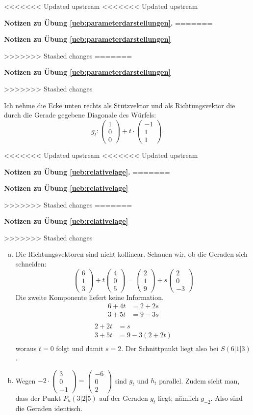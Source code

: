 \documentclass[%
11pt,%
twoside,%
titlepage,%
<<<<<<< Updated upstream
<<<<<<< Updated upstream
german,%
=======
swissgerman,%
>>>>>>> Stashed changes
=======
swissgerman,%
>>>>>>> Stashed changes
headsepline%
]{scrartcl}
\newcommand{\faReturnGray}{\textcolor{gray}{\faMailReply}} %
\newcommand{\faReturnGray}{\textcolor{gray}{\faMailReply}} %
\theoremstyle{definition}
\theoremstyle{plain}
\newcommand{\concatueb}[1]{ueb:#1}%
\newcommand{\concatlsg}[1]{lsg:#1}%
\newenvironment{lsg}[1]{%
<<<<<<< Updated upstream
<<<<<<< Updated upstream
    \par\noindent\textbf{Notizen zu Übung \ref{\concatueb{#1}}.}%
    \label{\concatlsg{#1}}
=======
    \par\noindent\textbf{Notizen zu Übung \ref{\concatueb{#1}}}\label{\concatlsg{#1}}
    \hfill\hyperref[\concatueb{#1}]{\faReturnGray}\par %
>>>>>>> Stashed changes
=======
    \par\noindent\textbf{Notizen zu Übung \ref{\concatueb{#1}}}\label{\concatlsg{#1}}
    \hfill\hyperref[\concatueb{#1}]{\faReturnGray}\par %
>>>>>>> Stashed changes
}{%
    \par%
}
\begin{document}
\begin{lsg}{parameterdarstellungen}
Ich nehme die Ecke unten rechts als Stützvektor und als Richtungsvektor die durch die Gerade gegebene Diagonale des Würfels:
$$g_t:\begin{pmatrix}
    1\\0\\0
\end{pmatrix}+t\cdot\begin{pmatrix}
    -1\\1\\1
\end{pmatrix}.$$
\end{lsg}
\begin{lsg}{relativelage}
\begin{enumerate}[a)]
    \item Die Richtungsvektoren sind nicht kollinear. Schauen wir, ob die Geraden sich schneiden:    $$\begin{pmatrix}6\\1\\3\end{pmatrix}+t\begin{pmatrix}4\\0\\5\end{pmatrix}=\begin{pmatrix}2\\1\\9\end{pmatrix}+s\begin{pmatrix}2\\0\\-3\end{pmatrix}$$
    Die zweite Komponente liefert keine Information.
    \begin{align*}
        6+4t &= 2+2s\\
        3+5t &= 9-3s\\
    \end{align*}
        \begin{align*}
        2+2t &= s\\
        3+5t &= 9-3(2+2t)\\
    \end{align*}
    woraus $t=0$ folgt und damit $s=2$. Der Schnittpunkt liegt also bei $S(6|1|3)$.

    \item Wegen $-2\cdot\begin{pmatrix}
        3\\0\\-1
    \end{pmatrix}=\begin{pmatrix}
        -6\\0\\2
    \end{pmatrix}$ sind $g_t$ und $h_t$ parallel. Zudem sieht man, dass der Punkt $P_h(3|2|5)$ auf der Geraden $g_t$ liegt; nämlich $g_{-2}$. Also sind die Geraden identisch.


\end{enumerate}
\end{lsg}
\end{document}
